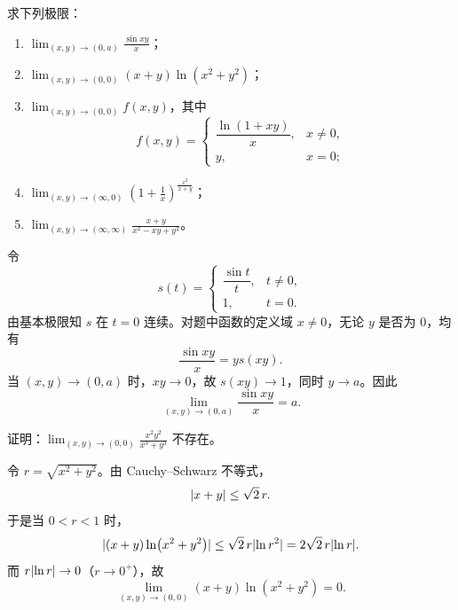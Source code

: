 \begin{xexercise}[1]
求下列极限：
  \begin{enumerate}[label=(\arabic*)]
    \item $\displaystyle\lim_{(x,y)\to(0,a)}\frac{\sin xy}{x}$；
    \item $\displaystyle\lim_{(x,y)\to(0,0)}(x+y)\ln(x^2+y^2)$；
    \item $\displaystyle\lim_{(x,y)\to(0,0)}f(x,y)$，其中
    \[
      f(x,y)=
      \begin{cases}
        \dfrac{\ln(1+xy)}{x}, & x\ne0,\\[4pt]
        y, & x=0;
      \end{cases}
    \]
    \item $\displaystyle\lim_{(x,y)\to(\infty,0)}\left(1+\frac1x\right)^{\frac{x^2}{x+y}}$；
    \item $\displaystyle\lim_{(x,y)\to(\infty,\infty)}\frac{x+y}{x^2-xy+y^2}$。
  \end{enumerate}
\end{xexercise}
\begin{xsolution}
令
\[
  s(t)=
  \begin{cases}
    \dfrac{\sin t}{t}, & t\ne0,\\[4pt]
    1, & t=0.
  \end{cases}
\]
由基本极限知 $s$ 在 $t=0$ 连续。对题中函数的定义域 $x\ne0$，无论 $y$ 是否为 $0$，均有
\[
  \frac{\sin xy}{x}=y s(xy).
\]
当 $(x,y)\to(0,a)$ 时，$xy\to0$，故 $s(xy)\to1$，同时 $y\to a$。因此
\[
  \boxed{\displaystyle
  \lim_{(x,y)\to(0,a)}\frac{\sin xy}{x}=a}.
\]
\end{xsolution}


\begin{xexercise}[2]
证明：$\displaystyle\lim_{(x,y)\to(0,0)}\frac{x^2y^2}{x^3+y^3}$ 不存在。
\end{xexercise}
\begin{xsolution}
令 $r=\sqrt{x^2+y^2}$。由 Cauchy--Schwarz 不等式，
\[
  \lvert x+y\rvert\le\sqrt2\,r.
\]
于是当 $0<r<1$ 时，
\[
  \lvert(x+y)\ln(x^2+y^2)\rvert
  \le
  \sqrt2\,r\lvert\ln r^2\rvert
  =2\sqrt2\,r\lvert\ln r\rvert.
\]
而 $r\lvert\ln r\rvert\to0$（$r\to0^+$），故
\[
  \boxed{\displaystyle
  \lim_{(x,y)\to(0,0)}(x+y)\ln(x^2+y^2)=0}.
\]
\end{xsolution}


